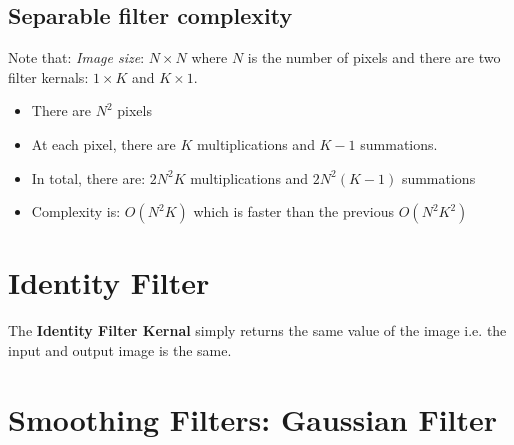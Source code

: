 \documentclass{report}
\begin{document}
\begin{minipage}{7in}
    \centering
    \hspace*{.2in}
\end{minipage}

\subsection{Separable filter complexity}

Note that: \textit{Image size}: $N \times N$ where $N$ is the number of pixels
and there are two filter kernals: $1 \times K$ and $K \times 1$.
\begin{itemize}
    \item There are $N^2$ pixels 
    \item At each pixel, there are $K$ multiplications and $K - 1$ summations.
    \item In total, there are: $2N^2 K$ multiplications and $2N^2(K - 1)$
    summations 
    \item Complexity is: $O(N^2 K)$ which is faster than the previous $O(N^2 K^2)$
\end{itemize}

\section{Identity Filter}

The \textbf{Identity Filter Kernal} simply returns the same value of the image
i.e. the input and output image is the same.

\section{Smoothing Filters: Gaussian Filter}
\end{document}

